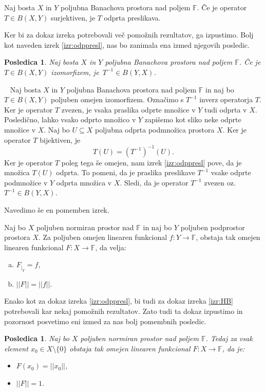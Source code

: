 \documentclass[12pt,a4paper,oneside,fleqn,openany]{book}
\newtheorem{posledica}[izrek]{Posledica}
\newcommand{\eopf}{\raisebox{0.8ex}{\framebox{}}} %
\newenvironment{dokaz}%
{\noindent{\bf Dokaz.}\ }%
{\hfill\eopf\par\bigskip}%
\newcommand{\F}{\mathbb{F}}
\newcommand{\abs}[1]{\ensuremath{\lvert #1 \rvert}}
\newcommand{\norm}[1]{\abs{\abs{#1}}}
\newcommand{\map}[3]{\ensuremath{{#1}:{#2}\rightarrow{#3}}}
\begin{document}
\begin{izrek}
	\label{izr:odppresl}
	Naj bosta $X$ in $Y$ poljubna Banachova prostora nad poljem $\F$. Če je operator $T\in B(X, Y)$ surjektiven, je $T$ odprta preslikava.
\end{izrek}
Ker bi za dokaz izreka potrebovali več pomožnih rezultatov, ga izpustimo. Bolj kot naveden izrek \ref{izr:odppresl}, nas bo zanimala ena izmed njegovih posledic.
\begin{posledica}
	\label{posl:odppresl}
	Naj bosta $X$ in $Y$ poljubna Banachova prostora nad poljem $\F$. Če je $T\in B(X, Y)$ izomorfizem, je~$T^{-1}\in B(Y, X)$.
\end{posledica}

\begin{dokaz}
	Naj bosta $X$ in $Y$ poljubna Banachova prostora nad poljem $\F$ in naj bo $T\in B(X, Y)$ poljuben omejen izomorfizem. Označimo s $T^{-1}$ inverz operatorja $T$. Ker je operator $T$ zvezen, je vsaka praslika odprte množice v $Y$ tudi odprta v $X$. Posledično, lahko vsako odprto množico v $Y$ zapišemo kot sliko neke odprte množice v $X$. Naj bo $U\subseteq X$ poljubna odprta podmnožica prostora $X$. Ker je operator $T$ bijektiven, je $$T(U) = (T^{-1})^{-1}(U).$$ Ker je operator $T$ poleg tega še omejen, nam izrek \ref{izr:odppresl} pove, da je množica $T(U)$ odprta. To pomeni, da je praslika preslikave $T^{-1}$ vsake odprte podmnožice v $Y$ odprta množica v $X$. Sledi, da je operator $T^{-1}$ zvezen oz. $T^{-1}\in B(Y, X)$.
\end{dokaz}
Navedimo še en pomemben izrek.
\begin{izrek}
	\label{izr:HB} 
	Naj bo $X$ poljuben normiran prostor nad $\F$ in naj bo $Y$ poljuben podprostor prostora $X$. Za poljuben omejen linearen funkcional $\map{f}{Y}{\F}$, obstaja tak omejen linearen funkcional $\map{F}{X}{\F}$, da velja: \begin{enumerate}[a)]
		\item $F_{|_Y} = f$,
		\item $\norm{F} = \norm{f}$.
	\end{enumerate}
\end{izrek}
Enako kot za dokaz izreka \ref{izr:odppresl}, bi tudi za dokaz izreka \ref{izr:HB} potrebovali kar nekaj pomožnih rezultatov. Zato tudi ta dokaz izpustimo in pozornost posvetimo eni izmed za nas bolj pomembnih posledic.
\begin{posledica}
	\label{posl:HB}
	Naj bo $X$ poljuben normiran prostor nad poljem $\F$. Tedaj za vsak element $x_0\in X\setminus\{0\}$ obstaja tak omejen linearen funkcional $\map{F}{X}{\F}$, da je: \begin{itemize}
		\item $F(x_0) = \norm{x_0}$,
		\item $\norm{F} = 1$.
	\end{itemize}
\end{posledica}
\end{document}
